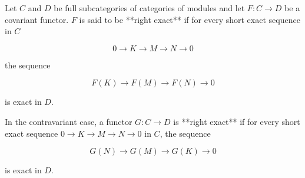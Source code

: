 Let $C$ and $D$ be full subcategories of categories of modules and let $F: C \to D$ be a covariant functor. $F$ is said to be **right exact** if for every short exact sequence in $C$

$$0 \to K \to M \to N \to 0$$

the sequence

$$F(K) \to F(M) \to F(N) \to 0$$

is exact in $D$.

In the contravariant case, a functor $G: C \to D$ is **right exact** if for every short exact sequence $0 \to K \to M \to N \to 0$ in $C$, the sequence

$$G(N) \to G(M) \to G(K) \to 0$$

is exact in $D$.
